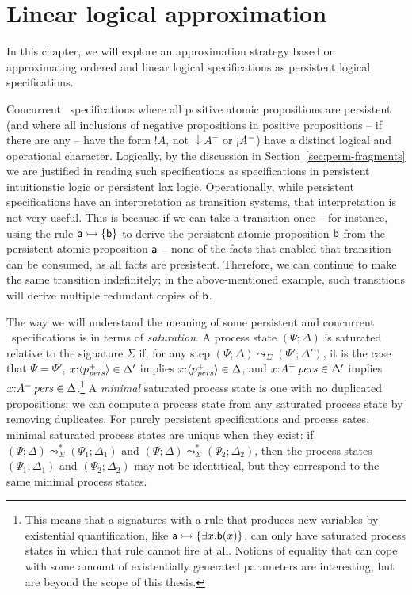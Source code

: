 \chapter{Linear logical approximation}
\label{chapter-approx}

In this chapter, we will explore an approximation strategy based on
approximating ordered and linear logical specifications as persistent
logical specifications. 

Concurrent \sls~specifications where all positive atomic propositions
are persistent (and where all inclusions of negative propositions in
positive propositions -- if there are any -- have the form ${!}A$, not
${\downarrow}A^-$ or ${\gnab}A^-$) have a distinct logical and
operational character. Logically, by the discussion in
Section~\ref{sec:perm-fragments} we are justified in reading such
specifications as specifications in persistent intuitionstic logic or
persistent lax logic. Operationally, while persistent specifications
have an interpretation as transition systems, that interpretation is
not very useful. This is because if we can take a transition once --
for instance, using the rule ${\sf a} \rightarrowtail \{ {\sf b} \}$ to derive
the persistent atomic proposition ${\sf b}$ from the persistent atomic
proposition ${\sf a}$ -- none of the facts that enabled that
transition can be consumed, as all facts are presistent. Therefore, we
can continue to make the same transition indefinitely; in the
above-mentioned example, such transitions will derive multiple
redundant copies of ${\sf b}$.

The way we will understand the meaning of some persistent and
concurrent \sls~specifications is in terms of {\it saturation}. A
process state $(\Psi; \Delta)$ is saturated relative to the signature
$\Sigma$ if, for any step $(\Psi; \Delta) \leadsto_\Sigma (\Psi';
\Delta')$, it is the case that $\Psi = \Psi'$, $x{:}\langle {p^+_{\it pers}} \rangle
\in \Delta'$ implies $x{:}\langle {p^+_{\it pers}} \rangle \in \Delta$, and
$x{:}{A^-}\,{{\it pers}} \in \Delta'$ implies $x{:}{A^-}\,{{\it pers}} \in
\Delta$.\footnote{This means that a signatures with a rule that
  produces new variables by existential quantification, like ${\sf a}
  \rightarrowtail \{ \exists x. {\sf b}(x) \}$, can only have saturated process
  states in which that rule cannot fire at all. Notions of equality
  that can cope with some amount of existentially generated parameters
  are interesting, but are beyond the scope of this thesis.} A {\it
  minimal} saturated process state is one with no duplicated
propositions; we can compute a process state from any saturated
process state by removing duplicates. For purely persistent
specifications and process sates, minimal saturated process states are
unique when they exist: if $(\Psi; \Delta) \leadsto^*_\Sigma (\Psi_1;
\Delta_1)$ and $(\Psi; \Delta) \leadsto^*_\Sigma (\Psi_2; \Delta_2)$,
then the process states $(\Psi_1; \Delta_1)$ and $(\Psi_2; \Delta_2)$
may not be identitical, but they correspond to the same minimal process
states.


